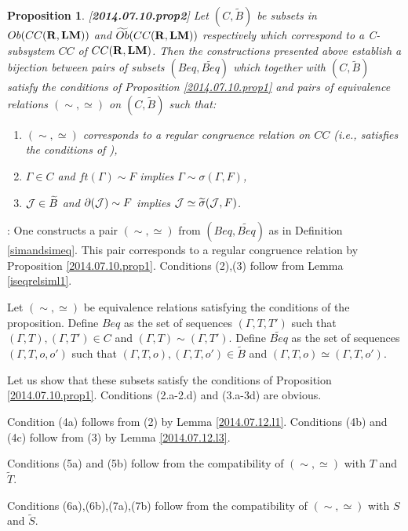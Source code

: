 \documentclass[11pt]{article}
\newenvironment{proof}{{\bf Proof}:}{\vskip 5mm }
\newtheorem{proposition}{Proposition}[subsection]
\newcommand{\llabel}[1]{\label{#1}[{\bf #1}]}
\newcommand{\rr}{{\bf R}}
\newcommand{\lm}{{\bf LM}}
\newcommand{\wt}{\widetilde}
\begin{document}
\begin{proposition}
\llabel{2014.07.10.prop2}
Let $(C,\wt{B})$ be subsets in $Ob(CC(\rr,\lm))$ and $\wt{Ob}(CC(\rr,\lm))$ respectively which correspond to a C-subsystem $CC$ of $CC(\rr,\lm)$. Then the constructions presented above establish a bijection between pairs of subsets $(Beq,\wt{Beq})$ which together with $(C,\wt{B})$ satisfy the conditions of Proposition \ref{2014.07.10.prop1} and pairs of equivalence relations $(\sim,\simeq)$ on $(C,\wt{B})$ such that:
%
\begin{enumerate}
\item $(\sim,\simeq)$ corresponds to a regular congruence relation on $CC$ (i.e., satisfies the conditions of \cite[Proposition 5.4]{Csubsystems}),
%
\item $\Gamma\in C$ and $ft(\Gamma)\sim F$ implies $\Gamma\sim \sigma(\Gamma,F)$,
%
\item ${\cal J}\in \wt{B}$ and $\partial({\cal J})\sim F$ implies ${\cal J}\simeq \wt{\sigma}({\cal J},F)$.
\end{enumerate}
\end{proposition}
%
\begin{proof}
One constructs a pair $(\sim,\simeq)$ from $(Beq,\wt{Beq})$ as in Definition \ref{simandsimeq}. 
This pair corresponds to a regular congruence relation by Proposition \ref{2014.07.10.prop1}.
Conditions (2),(3) follow from Lemma \ref{iseqrelsiml1}.

Let $(\sim,\simeq)$ be equivalence relations satisfying the conditions of the proposition. Define $Beq$ as the set of sequences $(\Gamma,T,T')$ such that $(\Gamma,T), (\Gamma,T')\in C$ and $(\Gamma,T)\sim (\Gamma,T')$. Define $\wt{Beq}$ as the set of sequences $(\Gamma,T,o,o')$ such that $(\Gamma,T,o),(\Gamma,T,o')\in \wt{B}$ and $(\Gamma,T,o)\simeq (\Gamma,T,o')$. 

Let us show that these subsets satisfy the conditions of Proposition \ref{2014.07.10.prop1}. Conditions (2.a-2.d) and (3.a-3d) are obvious. 

Condition (4a) follows from (2) by Lemma \ref{2014.07.12.l1}.
Conditions (4b) and (4c) follow from (3) by Lemma \ref{2014.07.12.l3}.

Conditions (5a) and (5b) follow from the compatibility of $(\sim,\simeq)$ with $T$ and $\wt{T}$. 

Conditions (6a),(6b),(7a),(7b) follow from the compatibility of $(\sim,\simeq)$ with $S$ and $\wt{S}$.
\end{proof}
\end{document}
